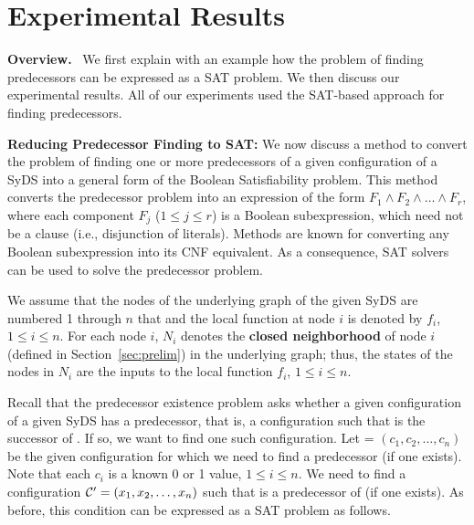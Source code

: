 \section{Experimental Results}
\label{sec:experiments}

\noindent
\textbf{Overview.}~ We first explain with an example how the 
problem of finding 
predecessors can be expressed as a SAT problem.
We then discuss our experimental results.
All of our experiments used the SAT-based approach for finding
predecessors.

\smallskip

\noindent
\textbf{Reducing Predecessor Finding to SAT:}
We now discuss  a method to convert the problem of finding one or more
predecessors of a given configuration of a SyDS into a general form 
of the Boolean Satisfiability problem. 
This method converts the predecessor 
problem into an expression of
the form $F_1 \wedge F_2 \wedge \ldots \wedge F_r$, where each
component $F_j$ ($1 \leq j \leq r$) is a Boolean subexpression,
which need not be a clause (i.e., disjunction of literals).
Methods are known for converting any Boolean subexpression
into its CNF equivalent.
As a consequence, SAT solvers 
can be used to solve the predecessor problem. 

We assume that the nodes of the underlying graph of the
given SyDS are numbered 1 through $n$ that
and the local function at node $i$ is denoted by $f_i$,
$1 \leq i \leq n$.
For each node $i$, $N_i$ denotes the \textbf{closed neighborhood}
of node $i$ (defined in Section~\ref{sec:prelim})
in the underlying graph; thus, the states of the nodes in $N_i$ 
are the inputs to the local function $f_i$,
$1 \leq i \leq n$.

\smallskip

Recall that the predecessor existence problem asks whether a given
configuration \calc{} of a given SyDS \cals{}
has a predecessor, that is, a configuration \calcp{} such that 
\calc{} is the successor of \calcp.
If so, we want to find one such configuration.
Let \calc{} = $(c_1, c_2, \ldots, c_n)$ be
the given configuration for which we need to 
find a predecessor (if one exists).
Note that each $c_i$ is a known 0 or 1 value, $1 \leq i \leq n$.
We need to find a configuration 
$\mbox{$\mathcal{C'}$}{} = (x_1, x_2, \ldots, x_n)$ such that \calcp{}
is a predecessor of \calc{} (if one exists). 
As before, this condition can be expressed as a SAT problem as follows.

